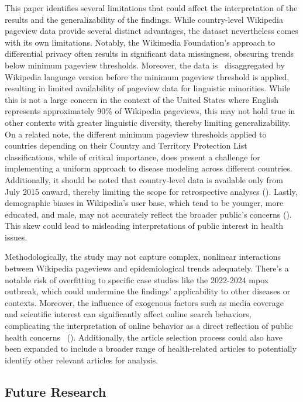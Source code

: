 \documentclass[
  12pt,
]{article}
\begin{document}
This paper identifies several limitations that could affect the
interpretation of the results and the generalizability of the findings.
While country-level Wikipedia pageview data provide several distinct
advantages, the dataset nevertheless comes with its own limitations.
Notably, the Wikimedia Foundation's approach to differential privacy
often results in significant data missingness, obscuring trends below
minimum pageview thresholds. Moreover, the data is~ disaggregated by
Wikipedia language version before the minimum pageview threshold is
applied, resulting in limited availability of pageview data for
linguistic minorities. While this is not a large concern in the context
of the United States where English represents approximately 90\% of
Wikipedia pageviews, this may not hold true in other contexts with
greater linguistic diversity, thereby limiting generalizability. On a
related note, the different minimum pageview thresholds applied to
countries depending on their Country and Territory Protection List
classifications, while of critical importance, does present a challenge
for implementing a uniform approach to disease modeling across different
countries. Additionally, it should be noted that country-level data is
available only from July 2015 onward, thereby limiting the scope for
retrospective analyses (). Lastly, demographic biases in Wikipedia's user base, which tend
to be younger, more educated, and male, may not accurately reflect the
broader public's concerns (). This skew could lead to misleading interpretations of public
interest in health issues.~

Methodologically, the study may not capture complex, nonlinear
interactions between Wikipedia pageviews and epidemiological trends
adequately. There's a notable risk of overfitting to specific case
studies like the 2022-2024 mpox outbreak, which could undermine the
findings' applicability to other diseases or contexts. Moreover, the
influence of exogenous factors such as media coverage and scientific
interest can significantly affect online search behaviors, complicating
the interpretation of online behavior as a direct reflection of public
health concerns~ ().
Additionally, the article selection process could also have been
expanded to include a broader range of health-related articles to
potentially identify other relevant articles for analysis.

\subsection{Future Research}\label{future-research}
\end{document}
